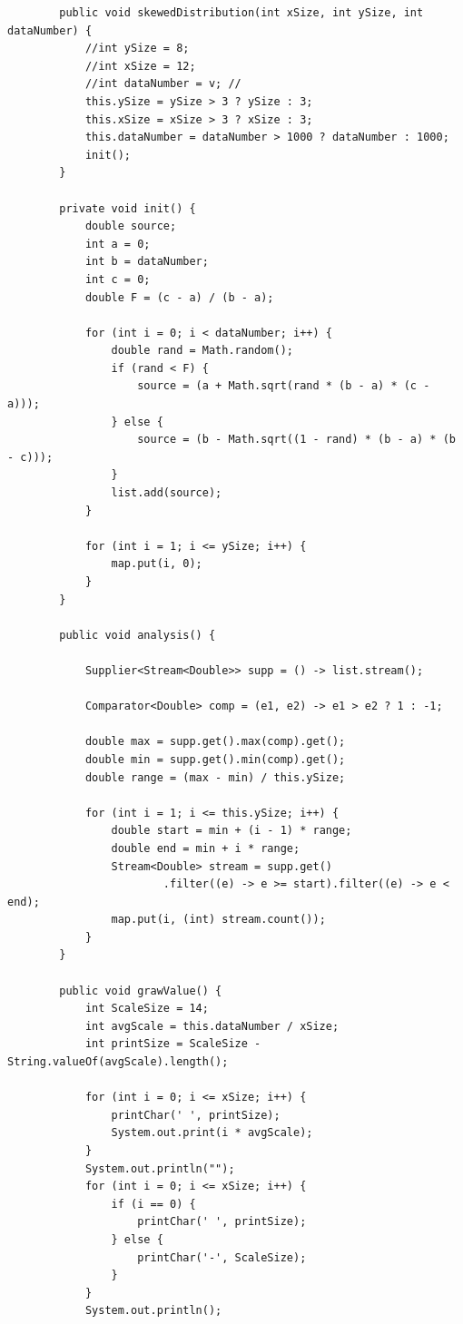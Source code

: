 \documentclass{article}
\begin{document}
\begin{verbatim}
        public void skewedDistribution(int xSize, int ySize, int dataNumber) {
            //int ySize = 8; 
            //int xSize = 12; 
            //int dataNumber = v; //
            this.ySize = ySize > 3 ? ySize : 3;
            this.xSize = xSize > 3 ? xSize : 3;
            this.dataNumber = dataNumber > 1000 ? dataNumber : 1000;
            init();
        }

        private void init() {
            double source;
            int a = 0;
            int b = dataNumber;
            int c = 0;
            double F = (c - a) / (b - a);

            for (int i = 0; i < dataNumber; i++) {
                double rand = Math.random();
                if (rand < F) {
                    source = (a + Math.sqrt(rand * (b - a) * (c - a)));
                } else {
                    source = (b - Math.sqrt((1 - rand) * (b - a) * (b - c)));
                }
                list.add(source);
            }

            for (int i = 1; i <= ySize; i++) {
                map.put(i, 0);
            }
        }

        public void analysis() {

            Supplier<Stream<Double>> supp = () -> list.stream();

            Comparator<Double> comp = (e1, e2) -> e1 > e2 ? 1 : -1;
            
            double max = supp.get().max(comp).get();
            double min = supp.get().min(comp).get();
            double range = (max - min) / this.ySize;
            
            for (int i = 1; i <= this.ySize; i++) {
                double start = min + (i - 1) * range;
                double end = min + i * range;
                Stream<Double> stream = supp.get()
                        .filter((e) -> e >= start).filter((e) -> e < end);
                map.put(i, (int) stream.count());
            }
        }

        public void grawValue() {
            int ScaleSize = 14; 
            int avgScale = this.dataNumber / xSize;
            int printSize = ScaleSize - String.valueOf(avgScale).length();
            
            for (int i = 0; i <= xSize; i++) {
                printChar(' ', printSize);
                System.out.print(i * avgScale);
            }
            System.out.println("");
            for (int i = 0; i <= xSize; i++) {
                if (i == 0) {
                    printChar(' ', printSize);
                } else {
                    printChar('-', ScaleSize);
                }
            }
            System.out.println();
            

\end{verbatim}
\end{document}
